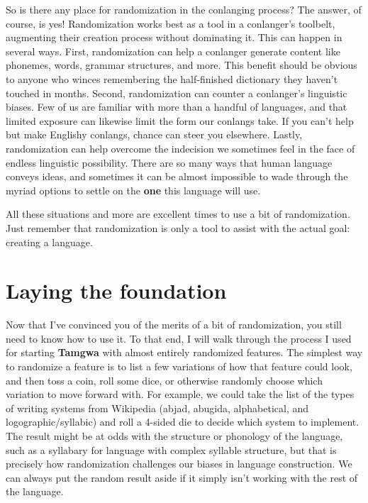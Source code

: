 \documentclass[a4paper,12pt,twoside,openright]{memoir}
\begin{document}
So is there any place for randomization in the conlanging process?  The answer, of course, is yes!  Randomization works best as a tool in a conlanger's toolbelt, augmenting their creation process without dominating it.  This can happen in several ways.  First, randomization can help a conlanger generate content like phonemes, words, grammar structures, and more.  This benefit should be obvious to anyone who winces remembering the half-finished dictionary they haven't touched in months. Second, randomization can counter a conlanger's linguistic biases.  Few of us are familiar with more than a handful of languages, and that limited exposure can likewise limit the form our conlangs take.  If you can't help but make Englishy conlangs, chance can steer you elsewhere.  Lastly, randomization can help overcome the indecision we sometimes feel in the face of endless linguistic possibility.  There are so many ways that human language conveys ideas, and sometimes it can be almost impossible to wade through the myriad options to settle on the \textbf{one} this language will use.

All these situations and more are excellent times to use a bit of randomization.  Just remember that randomization is only a tool to assist with the actual goal: creating a language.

\section*{Laying the foundation} %

Now that I've convinced you of the merits of a bit of randomization, you still need to know how to use it.  To that end, I will walk through the process I used for starting \textbf{Tamgwa} with almost entirely randomized features.  The simplest way to randomize a feature is to list a few variations of how that feature could look, and then toss a coin, roll some dice, or otherwise randomly choose which variation to move forward with.  For example, we could take the list of the types of writing systems from Wikipedia (abjad, abugida, alphabetical, and logographic/syllabic) and roll a 4-sided die to decide which system to implement.  The result might be at odds with the structure or phonology of the language, such as a syllabary for language with complex syllable structure, but that is precisely how randomization challenges our biases in language construction.  We can always put the random result aside if it simply isn't working with the rest of the language.
\end{document}
